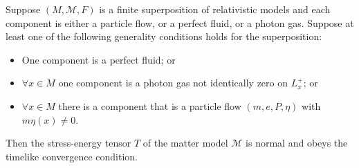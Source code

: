 Suppose $(M, \mathcal{M}, F)$ is a finite superposition of relativistic models and each component is either a particle flow, or a perfect fluid, or a photon gas. Suppose at least one of the following generality conditions holds for the superposition:
\begin{itemize}
\item[(a)] One component is a perfect fluid; or
\item[(b)] $\forall x \in M$ one component is a photon gas not identically zero on $L_x^+$; or
\item[(c)] $\forall x \in M$ there is a component that is a particle flow $(m, e, P, \eta)$ with $m\eta(x) \neq 0$.
\end{itemize}
Then the stress-energy tensor $\hat{T}$ of the matter model $\mathcal{M}$ is normal and obeys the timelike convergence condition.
